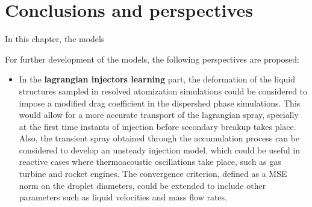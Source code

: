 \section{Conclusions and perspectives}

In this chapter, the models 


For further development of the models, the following perspectives are proposed:

\begin{itemize}

	\item In the \textbf{lagrangian injectors learning} part, the deformation of the liquid structures sampled in resolved atomization simulations could be considered to impose a modified drag coefficient in the dispershed phase simulations. This would allow for a more accurate transport of the lagrangian spray, specially at the first time instants of injection before secondary breakup takes place. Also, the transient spray obtained through the accumulation process can be considered to develop an unsteady injection model, which could be useful in reactive cases where thermoacoustic oscillations take place, such as gas turbine and rocket engines. The convergence criterion, defined as a MSE norm on the droplet diameters, could be extended to include other parameters such as liquid velocities and mass flow rates.

\end{itemize}